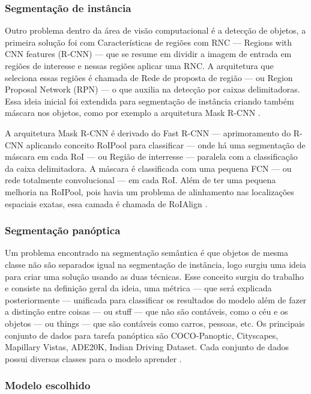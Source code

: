 \subsubsection*{Segmentação de instância}

Outro problema dentro da área de visão computacional é a detecção de objetos, a primeira solução foi com Características de regiões com RNC — Regions with CNN features (R-CNN) — que se resume em dividir a imagem de entrada em regiões de interesse e nessas regiões aplicar uma RNC. A arquitetura que seleciona essas regiões é chamada de Rede de proposta de região — ou Region Proposal Network (RPN) — o que auxilia na detecção por caixas delimitadoras. Essa ideia inicial foi extendida para segmentação de instância criando também máscara nos objetos, como por exemplo a arquitetura Mask R-CNN \cite{dp_semantic_segmantation, lapix}.

A arquitetura Mask R-CNN é derivado do Fast R-CNN — aprimoramento do R-CNN aplicando conceito RoIPool para classificar — onde há uma segmentação de máscara em cada RoI — ou Região de interresse — paralela com a classificação da caixa delimitadora. A máscara é classificada com uma pequena FCN — ou rede totalmente convolucional — em cada RoI. Além de ter uma pequena melhoria na RoIPool, pois havia um problema de alinhamento nas localizações espaciais exatas, essa camada é chamada de RoIAlign \cite{maskRCNN}.

\subsubsection*{Segmentação panóptica}

Um problema encontrado na segmentação semântica é que objetos de mesma classe não são separados igual na segmentação de instância, logo surgiu uma ideia para criar uma solução usando as duas técnicas. Esse conceito surgiu do trabalho  e consiste na definição geral da ideia, uma métrica — que será explicada posteriormente — unificada para classificar os resultados do modelo além de fazer a distinção entre coisas — ou stuff — que não são contáveis, como o céu e os objetos — ou things — que são contáveis como carros, pessoas, etc. 
Os principais conjunto de dados para tarefa panóptica são COCO-Panoptic, Cityscapes, Mapillary Vistas, ADE20K, Indian Driving Dataset. Cada conjunto de dados possui diversas classes para o modelo aprender \cite{v7labs2022panoptic}.

\subsubsection*{Modelo escolhido}

